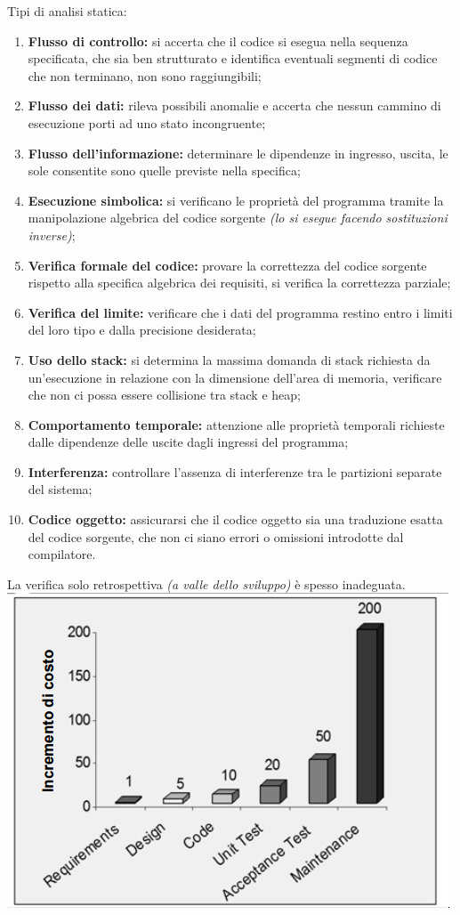 Tipi di analisi statica:
\begin{enumerate}
	\item \textbf{Flusso di controllo:} si accerta che il codice si esegua nella sequenza specificata, che sia ben strutturato e identifica eventuali segmenti di codice che non terminano, non sono raggiungibili;
	\item \textbf{Flusso dei dati:} rileva possibili anomalie e accerta che nessun cammino di esecuzione porti ad uno stato incongruente;
	\item \textbf{Flusso dell'informazione:} determinare le dipendenze in ingresso, uscita, le sole consentite sono quelle previste nella specifica;
	\item \textbf{Esecuzione simbolica:} si verificano le proprietà del programma tramite la manipolazione algebrica del codice sorgente \textit{(lo si esegue facendo sostituzioni inverse)};
	\item \textbf{Verifica formale del codice:} provare la correttezza del codice sorgente rispetto alla specifica algebrica dei requisiti, si verifica la correttezza parziale;
	\item \textbf{Verifica del limite:} verificare che i dati del programma restino entro i limiti del loro tipo e dalla precisione desiderata;
	\item \textbf{Uso dello stack:} si determina la massima domanda di stack richiesta da un'esecuzione in relazione con la dimensione dell'area di memoria, verificare che non ci possa essere collisione tra stack e heap;
	\item \textbf{Comportamento temporale:} attenzione alle proprietà temporali richieste dalle dipendenze delle uscite dagli ingressi del programma;
	\item \textbf{Interferenza:} controllare l'assenza di interferenze tra le partizioni separate del sistema;
	\item \textbf{Codice oggetto:} assicurarsi che il codice oggetto sia una traduzione esatta del codice sorgente, che non ci siano errori o omissioni introdotte dal compilatore.
\end{enumerate}
La verifica solo retrospettiva \textit{(a valle dello sviluppo)} è spesso inadeguata.
\includegraphics[width=0.5\columnwidth]{img5} %

